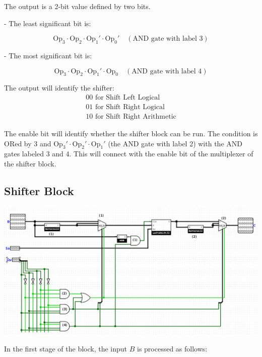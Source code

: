 \documentclass{article}
\begin{document}
The output is a 2-bit value defined by two bits. 

- The least significant bit is:

\[
\text{Op}_3 \cdot \text{Op}_2 \cdot \text{Op}_1' \cdot \text{Op}_0' \quad (\text{AND gate with label 3})
\]

- The most significant bit is:

\[
\text{Op}_3 \cdot \text{Op}_2 \cdot \text{Op}_1' \cdot \text{Op}_0 \quad (\text{AND gate with label 4})
\]

The output will identify the shifter:  
\[
\begin{array}{l}
00 \text{ for Shift Left Logical} \\
01 \text{ for Shift Right Logical} \\
10 \text{ for Shift Right Arithmetic}
\end{array}
\]

The enable bit will identify whether the shifter block can be run. The condition is ORed by 3 and \(\text{Op}_3' \cdot \text{Op}_2' \cdot \text{Op}_1'\) (the AND gate with label 2) with the AND gates labeled 3 and 4. This will connect with the enable bit of the multiplexer of the shifter block.

\subsection{Shifter Block}
\begin{center}
    \includegraphics[width=1\textwidth]{images/Shifter32.png}
\end{center}

\hspace{2em}In the first stage of the block, the input \( B \) is processed as follows:
\end{document}
